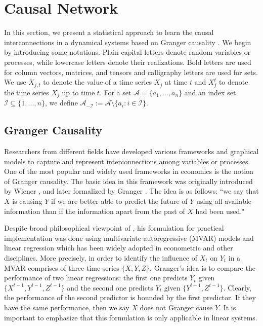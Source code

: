 

\section{Causal Network}\label{Sec1}

In this section, we present a statistical approach to learn the causal interconnections in a dynamical systems based on Granger causality \citet{granger}. 
We begin by introducing some notations.
Plain capital letters denote random variables or processes, while lowercase letters denote their realizations. 
Bold letters are used for column vectors, matrices, and tensors and calligraphy letters are used for sets. 
We use $X_{j,t}$ to denote the value of a time series $X_j$ at time $t$ 
and $X^{t}_j$ to denote the time series $X_j$ up to time $t$. 
For a set $\mathcal{A}=\{a_1,...,a_n\}$ and an index set $\mathcal{I}\subseteq\{1,...,n\}$, we define $\mathcal{A}_{-\mathcal{I}}:=\mathcal{A}\setminus\{a_i: i\in\mathcal{I}\}$. 



\subsection{Granger Causality}\label{sec:granger}

Researchers from different fields have developed various frameworks and graphical models to capture and represent interconnections among variables or processes.
One of the most popular and widely used frameworks in economics is the notion of Granger causality.
The basic idea in this framework was originally introduced by Wiener \citet{wiener1956theory}, and later formalized by Granger \citet{granger}. 
The idea is as follows: ``we say that $X$ is causing $Y$ if we are better able to predict the future of $Y$ using all available information than if the information apart from the past of $X$ had been used."

Despite broad philosophical viewpoint of \citet{granger1963economic}, his formulation for practical implementation was done using multivariate autoregressive (MVAR) models and linear regression which has been widely adopted in econometric and other disciplines.
More precisely, in order to identify the influence of $X_t$ on $Y_t$ in a MVAR comprises of three time series $\{X,Y,Z\}$, Granger's idea is to compare the performance of two linear regressions: the first one predicts $Y_t$ given $\{X^{t-1},Y^{t-1},Z^{t-1}\}$ and the second one predicts $Y_t$ given $\{Y^{t-1},Z^{t-1}\}$. Clearly, the performance of the second predictor is bounded by the first predictor. If they have the same performance, then we say $X$ does not Granger cause $Y$. It is important to emphasize that this formulation is only applicable in linear systems. 


